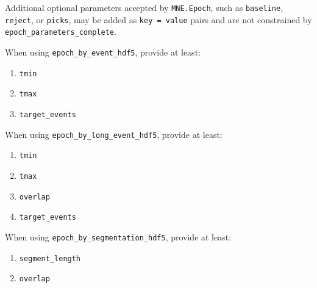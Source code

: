 \begin{tcolorbox}
\noindent Additional optional parameters accepted by \texttt{MNE.Epoch}, such as \texttt{baseline}, \texttt{reject}, or \texttt{picks}, may be added as \texttt{key = value} pairs and are not constrained by \texttt{epoch\_parameters\_complete}.\par\smallskip

\smallskip{}\par\smallskip

\noindent When using \texttt{epoch\_by\_event\_hdf5}, provide at least:\par\smallskip

\begin{enumerate}[leftmargin=1.5em,noitemsep,topsep=2pt]
\item \texttt{tmin}
\item \texttt{tmax}
\item \texttt{target\_events}
\end{enumerate}

\smallskip{}\par\smallskip

\noindent When using \texttt{epoch\_by\_long\_event\_hdf5}, provide at least:\par\smallskip

\begin{enumerate}[leftmargin=1.5em,noitemsep,topsep=2pt]
\item \texttt{tmin}
\item \texttt{tmax}
\item \texttt{overlap}
\item \texttt{target\_events}
\end{enumerate}

\smallskip{}\par\smallskip

\noindent When using \texttt{epoch\_by\_segmentation\_hdf5}, provide at least:\par\smallskip

\begin{enumerate}[leftmargin=1.5em,noitemsep,topsep=2pt]
\item \texttt{segment\_length}
\item \texttt{overlap}
\end{enumerate}


\end{tcolorbox}
